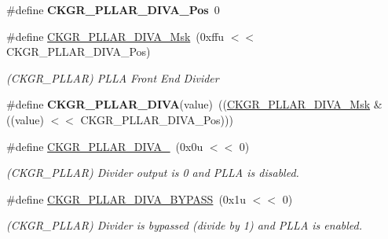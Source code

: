 \begin{DoxyCompactItemize}
\#define {\bfseries C\+K\+G\+R\+\_\+\+P\+L\+L\+A\+R\+\_\+\+D\+I\+V\+A\+\_\+\+Pos}~0
\item 
\mbox{\label{group__SAMV71__PMC_gab28dc8be7b52a0a8eb5031a21f1991d0}} 
\#define \mbox{\hyperlink{group__SAMV71__PMC_gab28dc8be7b52a0a8eb5031a21f1991d0}{C\+K\+G\+R\+\_\+\+P\+L\+L\+A\+R\+\_\+\+D\+I\+V\+A\+\_\+\+Msk}}~(0xffu $<$$<$ C\+K\+G\+R\+\_\+\+P\+L\+L\+A\+R\+\_\+\+D\+I\+V\+A\+\_\+\+Pos)
\begin{DoxyCompactList}\small\item\em (C\+K\+G\+R\+\_\+\+P\+L\+L\+AR) P\+L\+LA Front End Divider \end{DoxyCompactList}\item 
\mbox{\label{group__SAMV71__PMC_ga37e2da797562a8a8e9e59e3ec7a04528}} 
\#define {\bfseries C\+K\+G\+R\+\_\+\+P\+L\+L\+A\+R\+\_\+\+D\+I\+VA}(value)~((\mbox{\hyperlink{group__SAMV71__PMC_gab28dc8be7b52a0a8eb5031a21f1991d0}{C\+K\+G\+R\+\_\+\+P\+L\+L\+A\+R\+\_\+\+D\+I\+V\+A\+\_\+\+Msk}} \& ((value) $<$$<$ C\+K\+G\+R\+\_\+\+P\+L\+L\+A\+R\+\_\+\+D\+I\+V\+A\+\_\+\+Pos)))
\item 
\mbox{\label{group__SAMV71__PMC_gad605ace85fa67153f1682aeb90b1b5e5}} 
\#define \mbox{\hyperlink{group__SAMV71__PMC_gad605ace85fa67153f1682aeb90b1b5e5}{C\+K\+G\+R\+\_\+\+P\+L\+L\+A\+R\+\_\+\+D\+I\+V\+A\+\_}}~(0x0u $<$$<$ 0)
\begin{DoxyCompactList}\small\item\em (C\+K\+G\+R\+\_\+\+P\+L\+L\+AR) Divider output is 0 and P\+L\+LA is disabled. \end{DoxyCompactList}\item 
\mbox{\label{group__SAMV71__PMC_ga20d7b7780216bc45bee25bec4438b4eb}} 
\#define \mbox{\hyperlink{group__SAMV71__PMC_ga20d7b7780216bc45bee25bec4438b4eb}{C\+K\+G\+R\+\_\+\+P\+L\+L\+A\+R\+\_\+\+D\+I\+V\+A\+\_\+\+B\+Y\+P\+A\+SS}}~(0x1u $<$$<$ 0)
\begin{DoxyCompactList}\small\item\em (C\+K\+G\+R\+\_\+\+P\+L\+L\+AR) Divider is bypassed (divide by 1) and P\+L\+LA is enabled. \end{DoxyCompactList}\item 
\mbox{\label{group__SAMV71__PMC_ga79c2a1a20693793a073171ca87cbca62}} 

\end{DoxyCompactItemize}
